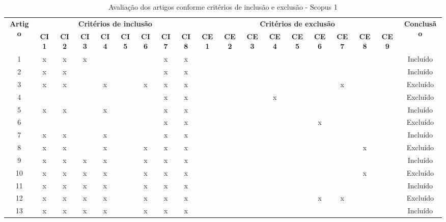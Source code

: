 \documentclass[
	12pt,				%
	oneside,			%
	a4paper,			%
	english,			%
	brazil				%
	]{abntex2ppgsi}
\begin{document}
\begin{apendicesenv}
\begin{table}[H]
\centering
\caption{Avaliação dos artigos conforme critérios de inclusão e exclusão - Scopus 1}
\label{tab:critincluexclu} 
\setlength{\tabcolsep}{1.5pt} %
\footnotesize %
\begin{tabular}{c | c c c c c c c c | c c c c c c c c c | c}
\toprule
    \multirow{2}{*}{\textbf{Artigo}} & 
    \multicolumn{8}{c|}{\textbf{Critérios de inclusão}} &
    \multicolumn{9}{c|}{\textbf{Critérios de exclusão}} &
    \multirow{2}{*}{\textbf{Conclusão}} \\ 
    \cline{2-18}
 & \tiny\textbf{CI1} & \tiny\textbf{CI2} & \tiny\textbf{CI3} & \tiny\textbf{CI4} & \tiny\textbf{CI5} & \tiny\textbf{CI6} & \tiny\textbf{CI7} & \tiny\textbf{CI8} & \tiny\textbf{CE1} & \tiny\textbf{CE2} & \tiny\textbf{CE3} & \tiny\textbf{CE4} & \tiny\textbf{CE5} & \tiny\textbf{CE6} & \tiny\textbf{CE7} & \tiny\textbf{CE8} & \tiny\textbf{CE9} & \\
\midrule
 1 & x & x & x &   &   &   & x & x &   &   &   &   &   &   &   &   &   & Incluído \\
 2 & x & x &   &   &   &   & x & x &   &   &   &   &   &   &   &   &   & Incluído \\
 3 & x & x &   & x &   & x & x & x &   &   &   &   &   &   & x &   &   & Excluído \\
 4 &   &   &   &   &   &   & x & x &   &   &   & x &   &   &   &   &   & Excluído \\
 5 & x & x &   & x &   &   & x & x &   &   &   &   &   &   &   &   &   & Incluído \\
 6 &   &   &   &   &   &   & x & x &   &   &   &   &   & x &   &   &   & Excluído \\
 7 & x & x &   & x &   &   & x & x &   &   &   &   &   &   &   &   &   & Incluído \\
 8 & x & x &   & x &   & x & x & x &   &   &   &   &   &   &   & x &   & Excluído \\
 9 & x & x & x & x &   & x & x & x &   &   &   &   &   &   &   &   &   & Incluído \\
10 & x & x & x & x &   & x & x & x &   &   &   &   &   &   &   & x &   & Excluído \\
11 & x & x & x & x &   & x & x & x &   &   &   &   &   &   &   &   &   & Incluído \\
12 & x & x & x & x &   & x & x & x &   &   &   &   &   & x & x &   &   & Excluído \\
13 & x & x & x & x &   & x & x & x &   &   &   &   &   &   &   &   &   & Incluído \\

\end{tabular}
\end{table}
\end{apendicesenv}
\end{document}
